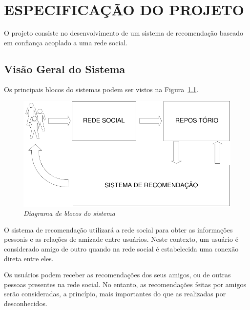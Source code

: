 \chapter{ESPECIFICAÇÃO DO PROJETO} %
\label{cha:especificacao_do_projeto}


 O projeto consiste no desenvolvimento de um sistema de recomendação baseado em confiança acoplado a uma rede social.

\section{Visão Geral do Sistema} %
\label{sec:visao_do_sistema}
 Os principais blocos do sistemas podem ser vistos na Figura~\ref{fig:escopo}.

\begin{figure}
  \centering
  \includegraphics[width=\textwidth]{imagens/Diagrama_Visao_Geral}
  \caption{\it Diagrama de blocos do sistema}
  \label{fig:escopo}
\end{figure}

 O sistema de recomendação utilizará a rede social para obter as informações pessoais e as relações de amizade entre usuários. Neste contexto, um usuário é considerado amigo de outro quando na rede social é estabelecida uma conexão direta entre eles.

 Os usuários podem receber as recomendações dos seus amigos, ou de outras pessoas presentes na rede social. No entanto, as recomendações feitas por amigos serão consideradas, a princípio, mais importantes do que as realizadas por desconhecidos.


